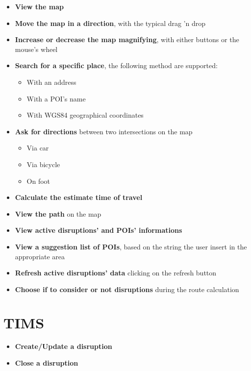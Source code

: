 \begin{itemize}
	\item \textbf{View the map}
	\item \textbf{Move the map in a direction}, with the typical drag 'n drop
	\item \textbf{Increase or decrease the map magnifying}, with either buttons 
	or the mouse's wheel
	\item \textbf{Search for a specific place}, the following method are 
	supported:
	\begin{itemize}
		\item With an address
		\item With a POI's name
		\item With WGS84 geographical coordinates
	\end{itemize}
	\item \textbf{Ask for directions} between two intersections on the map
	\begin{itemize}
		\item Via car
		\item Via bicycle
		\item On foot
	\end{itemize}
	\item \textbf{Calculate the estimate time of travel}
	\item \textbf{View the path} on the map
	\item \textbf{View active disruptions' and POIs' informations}
	\item \textbf{View a suggestion list of POIs}, based on the string the user insert in the appropriate area
	\item \textbf{Refresh active disruptions' data} clicking on the refresh button
	\item \textbf{Choose if to consider or not disruptions} during the route calculation 
\end{itemize}
\section{TIMS}
	\begin{itemize}
	\item \textbf{Create/Update a disruption}
	\item \textbf{Close a disruption}
	\end{itemize}

